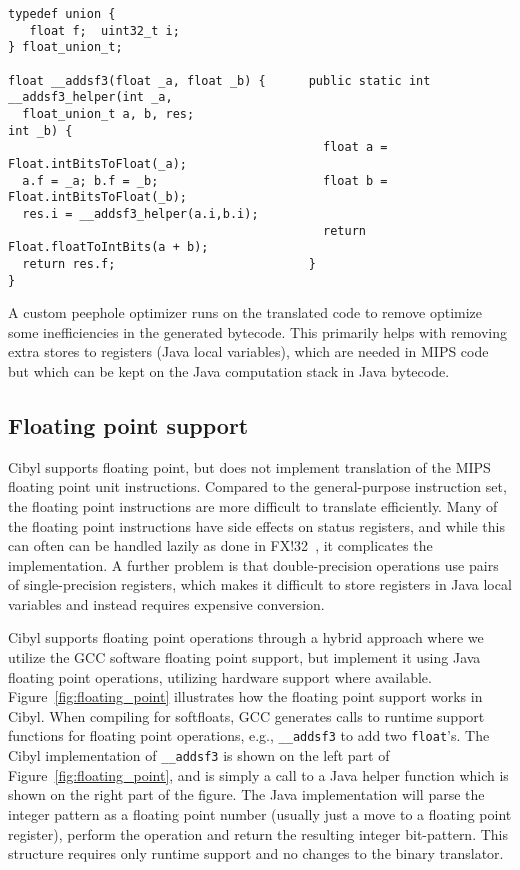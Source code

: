 \begin{figure*}[htb]
  \centering
  \scriptsize
\begin{verbatim}
typedef union {
   float f;  uint32_t i;
} float_union_t;

float __addsf3(float _a, float _b) {      public static int __addsf3_helper(int _a,
  float_union_t a, b, res;                                                  int _b) {
                                            float a = Float.intBitsToFloat(_a);
  a.f = _a; b.f = _b;                       float b = Float.intBitsToFloat(_b);
  res.i = __addsf3_helper(a.i,b.i);
                                            return Float.floatToIntBits(a + b);
  return res.f;                           }
}
\end{verbatim}
  \caption[Cibyl floating point support]{Cibyl floating point support. The left part of the figure shows the
    C runtime support, the right part shows the Java implementation of the
    operation}
  \label{fig:floating_point}
\end{figure*}

A custom peephole optimizer runs on the translated code to remove optimize
some inefficiencies in the generated bytecode. This primarily helps with
removing extra stores to registers (Java local variables), which are needed in
MIPS code but which can be kept on the Java computation stack in Java
bytecode.

\subsection{Floating point support}
Cibyl supports floating point, but does not implement translation of the MIPS
floating point unit instructions. Compared to the general-purpose instruction
set, the floating point instructions are more difficult to translate
efficiently. Many of the floating point instructions have side effects on
status registers, and while this can often can be handled lazily as done in
FX!32~\cite{hookway97fx32}, it complicates the implementation. A further
problem is that double-precision operations use pairs of single-precision
registers, which makes it difficult to store registers in Java local variables
and instead requires expensive conversion.

Cibyl supports floating point operations through a hybrid approach where we
utilize the GCC software floating point support, but implement it using Java
floating point operations, utilizing hardware support where available.
Figure~\ref{fig:floating_point} illustrates how the floating point support
works in Cibyl. When compiling for softfloats, GCC generates calls to runtime
support functions for floating point operations, e.g., \texttt{\_\_addsf3} to
add two \texttt{float}'s. The Cibyl implementation of \texttt{\_\_addsf3} is
shown on the left part of Figure~\ref{fig:floating_point}, and is simply a
call to a Java helper function which is shown on the right part of the figure.
The Java implementation will parse the integer pattern as a floating point
number (usually just a move to a floating point register), perform the
operation and return the resulting integer bit-pattern. This structure
requires only runtime support and no changes to the binary translator.

